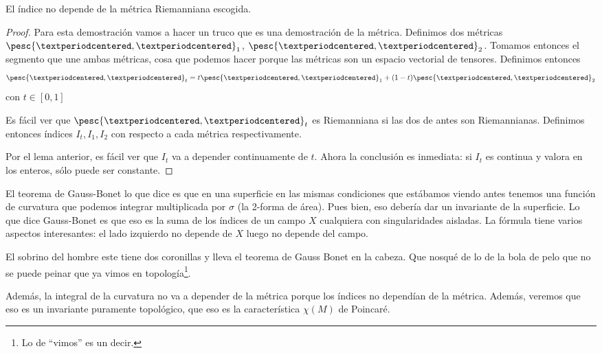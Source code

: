 \begin{lemma} El índice no depende de la métrica Riemanniana escogida.
\end{lemma}

\begin{proof} Para esta demostración vamos a hacer un truco que es una demostración de la métrica. Definimos dos métricas $\pesc{·,·}_1$, $\pesc{·,·}_2$. Tomamos entonces el segmento que une ambas métricas, cosa que podemos hacer porque las métricas son un espacio vectorial de tensores. Definimos entonces  \[ \pesc{·,·}_t = t \pesc{·,·}_1 + (1-t)\pesc{·,·}_2 \] con $t∈[0,1]$

Es fácil ver que $\pesc{·,·}_t$ es Riemanniana si las dos de antes son Riemannianas. Definimos entonces índices $I_t, I_1, I_2$ con respecto a cada métrica respectivamente.

Por el lema anterior, es fácil ver que $I_t$ va a depender continuamente de $t$. Ahora la conclusión es inmediata: si $I_t$ es continua y valora en los enteros, sólo puede ser constante.
\end{proof}

El teorema de Gauss-Bonet lo que dice es que en una superficie en las mismas condiciones que estábamos viendo antes tenemos una función de curvatura que podemos integrar multiplicada por $σ$ (la 2-forma de área). Pues bien, eso debería dar un invariante de la superficie. Lo que dice Gauss-Bonet es que eso es la suma de los índices de un campo $X$ cualquiera con singularidades aisladas. La fórmula tiene varios aspectos interesantes: el lado izquierdo no depende de $X$ luego no depende del campo.

El sobrino del hombre este tiene dos coronillas y lleva el teorema de Gauss Bonet en la cabeza. Que nosqué de lo de la bola de pelo que no se puede peinar que ya vimos en topología\footnote{Lo de ``vimos'' es un decir.}.

Además, la integral de la curvatura no va a depender de la métrica porque los índices no dependían de la métrica. Además, veremos que eso es un invariante puramente topológico, que eso es la característica $χ(M)$ de Poincaré.
